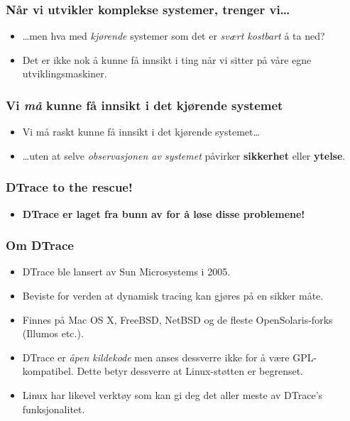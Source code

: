 \documentclass{beamer}
\begin{document}
\begin{frame}
    \frametitle{Når vi utvikler komplekse systemer, trenger vi…}
\begin{itemize}

    \item …men hva med \emph{kjørende} systemer som det er \emph{svært kostbart}
        å ta ned?

    \item  Det er ikke nok å kunne få innsikt i ting når vi sitter på våre egne
      utviklingsmaskiner.
\end{itemize}
\end{frame}

\begin{frame}
    \frametitle{Vi \emph{må} kunne få innsikt i det kjørende systemet}
\begin{itemize}
  \item Vi må raskt kunne få innsikt i det kjørende systemet…
  \item …uten at selve \emph{observasjonen av systemet} påvirker \textbf{sikkerhet} eller \textbf{ytelse}.
\end{itemize}
\end{frame}

\begin{frame}
    \frametitle{DTrace to the rescue!}

    \begin{itemize}
        \item \textbf{DTrace er laget fra bunn av for å løse disse problemene!}
    \end{itemize}

\end{frame}

\begin{frame}
    \frametitle{Om DTrace}
    \begin{itemize}

\item DTrace ble lansert av Sun Microsystems i 2005.

\item Beviste for verden at dynamisk tracing kan gjøres på en sikker måte.

\item Finnes på Mac OS X, FreeBSD, NetBSD og de fleste OpenSolaris-forks (Illumos etc.).

\item DTrace er \emph{åpen kildekode} men anses dessverre ikke for å være GPL-kompatibel.
    Dette betyr dessverre at Linux-støtten er begrenset.

\item Linux har likevel verktøy som kan gi deg det aller meste av DTrace's funksjonalitet.


    \end{itemize}

\end{frame}
\end{document}
